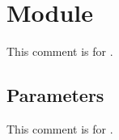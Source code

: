 \section{Module }\label{module-Ocamlary-module-FunctorTypeOf}%
This comment is for .

\subsection{Parameters\label{parameters}}%
\label{module-Ocamlary-module-FunctorTypeOf-argument-1-Collection}\begin{ocamlindent}This comment is for .


\end{ocamlindent}
